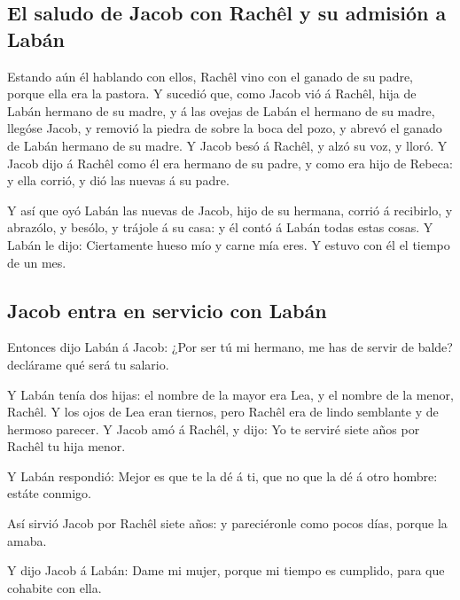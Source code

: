 \hypertarget{el-saludo-de-jacob-con-rachuxeal-y-su-admisiuxf3n-a-labuxe1n}{%
\subsection{El saludo de Jacob con Rachêl y su admisión a
Labán}\label{el-saludo-de-jacob-con-rachuxeal-y-su-admisiuxf3n-a-labuxe1n}}

 Estando aún él hablando con ellos, Rachêl vino con el
ganado de su padre, porque ella era la pastora.  Y sucedió
que, como Jacob vió á Rachêl, hija de Labán hermano de su madre, y á las
ovejas de Labán el hermano de su madre, llegóse Jacob, y removió la
piedra de sobre la boca del pozo, y abrevó el ganado de Labán hermano de
su madre.  Y Jacob besó á Rachêl, y alzó su voz, y lloró.
 Y Jacob dijo á Rachêl como él era hermano de su padre, y
como era hijo de Rebeca: y ella corrió, y dió las nuevas á su padre.

 Y así que oyó Labán las nuevas de Jacob, hijo de su
hermana, corrió á recibirlo, y abrazólo, y besólo, y trájole á su casa:
y él contó á Labán todas estas cosas.  Y Labán le dijo:
Ciertamente hueso mío y carne mía eres. Y estuvo con él el tiempo de un
mes.

\hypertarget{jacob-entra-en-servicio-con-labuxe1n}{%
\subsection{Jacob entra en servicio con
Labán}\label{jacob-entra-en-servicio-con-labuxe1n}}

 Entonces dijo Labán á Jacob: ¿Por ser tú mi hermano, me
has de servir de balde? declárame qué será tu salario.

 Y Labán tenía dos hijas: el nombre de la mayor era Lea, y
el nombre de la menor, Rachêl.  Y los ojos de Lea eran
tiernos, pero Rachêl era de lindo semblante y de hermoso parecer.
 Y Jacob amó á Rachêl, y dijo: Yo te serviré siete años por
Rachêl tu hija menor.

 Y Labán respondió: Mejor es que te la dé á ti, que no que
la dé á otro hombre: estáte conmigo.

 Así sirvió Jacob por Rachêl siete años: y pareciéronle
como pocos días, porque la amaba.

 Y dijo Jacob á Labán: Dame mi mujer, porque mi tiempo es
cumplido, para que cohabite con ella.

